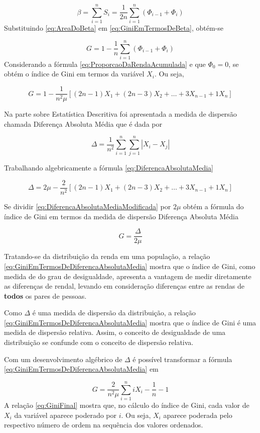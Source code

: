 \documentclass[
]{book}
\begin{document}
\[
\beta = \sum_{i=1}^{n}S_i = \dfrac{1}{2n}\sum_{i=1}^{n}(\Phi_{i-1} + \Phi_i)
\label{eq:AreaDoBeta}
\]
Substituindo \eqref{eq:AreaDoBeta} em \eqref{eq:GiniEmTermosDeBeta}, obtém-se

\[
G = 1 - \dfrac{1}{n}\sum_{i=1}^{n}(\Phi_{i-1} + \Phi_i)
\label{eq:GiniEmTermosDePhi}
\]
Considerando a fórmula \eqref{eq:ProporcaoDaRendaAcumulada} e que \(\Phi_0 = 0\), se obtém o índice de Gini em termos da variável \(X_i\). Ou seja,

\[
G = 1 - \dfrac{1}{n^2\mu}[(2n-1)X_1 + (2n-3)X_2 + \dots + 3X_{n-1} + 1X_n]
\label{eq:GiniEmTermosDeXi}
\]

Na parte sobre Estatística Descritiva foi apresentada a medida de dispersão chamada Diferença Absoluta Média que é dada por

\[
\Delta = \dfrac{1}{n^2}\sum_{i=1}^{n}\sum_{j=1}^{n}|X_i - X_j|
\label{eq:DiferencaAbsolutaMedia}
\]

Trabalhando algebricamente a fórmula \eqref{eq:DiferencaAbsolutaMedia}

\[
\Delta = 2\mu - \dfrac{2}{n^2}[(2n-1)X_1 + (2n-3)X_2 + \dots + 3X_{n-1} + 1X_n]
\label{eq:DiferencaAbsolutaMediaModificada}
\]

Se dividir \eqref{eq:DiferencaAbsolutaMediaModificada} por \(2\mu\) obtém a fórmula do índice de Gini em termos da medida de dispersão Diferença Absoluta Média

\[
G = \dfrac{\Delta}{2\mu}
\label{eq:GiniEmTermosDeDiferencaAbsolutaMedia}
\]

Tratando-se da distribuição da renda em uma população, a relação \eqref{eq:GiniEmTermosDeDiferencaAbsolutaMedia} mostra que o índice de Gini, como medida de do grau de desigualdade, apresenta a vantagem de medir diretamente as diferenças de rendal, levando em consideração diferenças entre as rendas de \textbf{todos} os pares de pessoas.

Como \(\Delta\) é uma medida de dispersão da distribuição, a relação \eqref{eq:GiniEmTermosDeDiferencaAbsolutaMedia} mostra que o índice de Gini é uma medida de dispersão relativa. Assim, o conceito de desigualdade de uma distribuição se confunde com o conceito de dispersão relativa.

Com um desenvolvimento algébrico de \(\Delta\) é possível transformar a fórmula \eqref{eq:GiniEmTermosDeDiferencaAbsolutaMedia} em

\[
G = \dfrac{2}{n^2\mu}\sum_{i=1}^{n} iX_i - \dfrac{1}{n} - 1
\label{eq:GiniFinal}
\]
A relação \eqref{eq:GiniFinal} mostra que, no cálculo do índice de Gini, cada valor de \(X_i\) da variável aparece poderado por \(i\). Ou seja, \(X_i\) aparece poderada pelo respectivo número de ordem na sequência dos valores ordenados.
\end{document}
